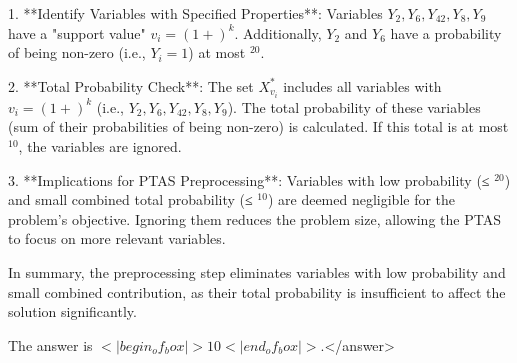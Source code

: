 1. **Identify Variables with Specified Properties**:  
   Variables \( Y_2, Y_6, Y_{42}, Y_8, Y_9 \) have a "support value" \( v_i = (1+)^k \). Additionally, \( Y_2 \) and \( Y_6 \) have a probability of being non-zero (i.e., \( Y_i = 1 \)) at most \( ^{20} \).  

2. **Total Probability Check**:  
   The set \( X_{v_i}^* \) includes all variables with \( v_i = (1+)^k \) (i.e., \( Y_2, Y_6, Y_{42}, Y_8, Y_9 \)). The total probability of these variables (sum of their probabilities of being non-zero) is calculated. If this total is at most \( ^{10} \), the variables are ignored.  

3. **Implications for PTAS Preprocessing**:  
   Variables with low probability (≤ \( ^{20} \)) and small combined total probability (≤ \( ^{10} \)) are deemed negligible for the problem’s objective. Ignoring them reduces the problem size, allowing the PTAS to focus on more relevant variables.  

In summary, the preprocessing step eliminates variables with low probability and small combined contribution, as their total probability is insufficient to affect the solution significantly.  

The answer is \(<|begin_of_box|>10<|end_of_box|>\).</answer>